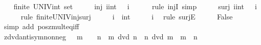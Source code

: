 \begin{isabellebody}
%
\isadelimproof
%
\endisadelimproof
%
\isatagproof
{}\isamarkupfalse%
\isanewline
\ \ \isamarkupfalse%
\ {\isachardoublequoteopen}finite\ {\isacharparenleft}{\kern0pt}UNIV{\isacharcolon}{\kern0pt}{\isacharcolon}{\kern0pt}int\ set{\isacharparenright}{\kern0pt}{\isachardoublequoteclose}\isanewline
\ \ \isamarkupfalse%
\ \isamarkupfalse%
\ {\isachardoublequoteopen}inj\ {\isacharparenleft}{\kern0pt}{\isasymlambda}i{\isacharcolon}{\kern0pt}{\isacharcolon}{\kern0pt}int{\isachardot}{\kern0pt}\ {}\ {\isacharasterisk}{\kern0pt}\ i{\isacharparenright}{\kern0pt}{\isachardoublequoteclose}\isanewline
\ \ \ \ \isamarkupfalse%
\ {\isacharparenleft}{\kern0pt}rule\ injI{\isacharparenright}{\kern0pt}\ simp\isanewline
\ \ \isamarkupfalse%
\ \isamarkupfalse%
\ {\isachardoublequoteopen}surj\ {\isacharparenleft}{\kern0pt}{\isasymlambda}i{\isacharcolon}{\kern0pt}{\isacharcolon}{\kern0pt}int{\isachardot}{\kern0pt}\ {}\ {\isacharasterisk}{\kern0pt}\ i{\isacharparenright}{\kern0pt}{\isachardoublequoteclose}\isanewline
\ \ \ \ \isamarkupfalse%
\ {\isacharparenleft}{\kern0pt}rule\ finite{\isacharunderscore}{\kern0pt}UNIV{\isacharunderscore}{\kern0pt}inj{\isacharunderscore}{\kern0pt}surj{\isacharparenright}{\kern0pt}\isanewline
\ \ \isamarkupfalse%
\ \isamarkupfalse%
\ i\ {\isacharcolon}{\kern0pt}{\isacharcolon}{\kern0pt}\ int\ \ {\isachardoublequoteopen}{}\ {\isacharequal}{\kern0pt}\ {}\ {\isacharasterisk}{\kern0pt}\ i{\isachardoublequoteclose}\ \isamarkupfalse%
\ {\isacharparenleft}{\kern0pt}rule\ surjE{\isacharparenright}{\kern0pt}\isanewline
\ \ \isamarkupfalse%
\ \isamarkupfalse%
\ False\ \isamarkupfalse%
\ {\isacharparenleft}{\kern0pt}simp\ add{\isacharcolon}{\kern0pt}\ pos{\isacharunderscore}{\kern0pt}zmult{\isacharunderscore}{\kern0pt}eq{\isacharunderscore}{\kern0pt}{}{\isacharunderscore}{\kern0pt}iff{\isacharparenright}{\kern0pt}\isanewline
{}\isamarkupfalse%
%
\endisatagproof
{\isafoldproof}%
%
\isadelimproof
%
\endisadelimproof
%
\isadelimdocument
%
\endisadelimdocument
%
\isatagdocument
%
\isamarkuptrue%
%
\endisatagdocument
{\isafolddocument}%
%
\isadelimdocument
%
\endisadelimdocument
{}\isamarkupfalse%
\ zdvd{\isacharunderscore}{\kern0pt}antisym{\isacharunderscore}{\kern0pt}nonneg{\isacharcolon}{\kern0pt}\ {\isachardoublequoteopen}{}\ {\isasymle}\ m\ {\isasymLongrightarrow}\ {}\ {\isasymle}\ n\ {\isasymLongrightarrow}\ m\ dvd\ n\ {\isasymLongrightarrow}\ n\ dvd\ m\ {\isasymLongrightarrow}\ m\ {\isacharequal}{\kern0pt}\ n{\isachardoublequoteclose}\isanewline

\end{isabellebody}
